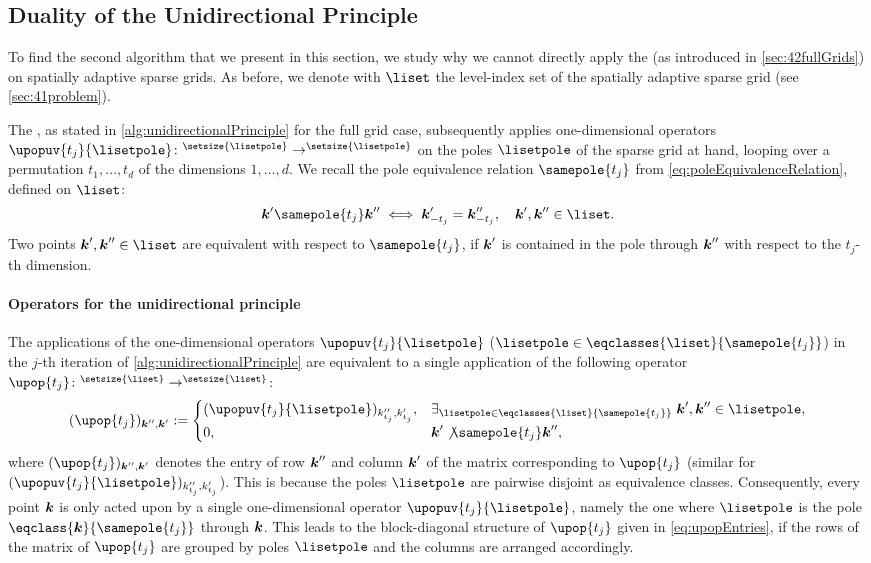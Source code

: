 \subsection{Duality of the Unidirectional Principle}
\label{sec:452duality}

To find the second algorithm that we present in this section,
we study why we cannot directly apply the \up
(as introduced in \cref{sec:42fullGrids}) on spatially adaptive sparse grids.
As before, we denote with $\liset$ the level-index set of
the spatially adaptive sparse grid (see \cref{sec:41problem}).

The \up, as stated in
\cref{alg:unidirectionalPrinciple} for the full grid case,
subsequently applies one-dimensional operators
$\upopuv{t_j}{\lisetpole}\colon \real^{\setsize{\lisetpole}} \to
\real^{\setsize{\lisetpole}}$
on the poles $\lisetpole$ of the sparse grid at hand,
looping over a permutation $t_1, \dotsc, t_d$
of the dimensions $1, \dotsc, d$.
We recall the pole equivalence relation $\samepole{t_j}$
from \cref{eq:poleEquivalenceRelation}, defined on $\liset$:
\begin{equation}
  \*k' \samepole{t_j} \*k'' \iff \*k'_{-t_j} = \*k''_{-t_j},\quad
  \*k', \*k'' \in \liset.
\end{equation}
Two points $\*k', \*k'' \in \liset$ are equivalent with respect to
$\samepole{t_j}$, if ${\boldsymbol{k}}'$ is contained in the pole through ${\boldsymbol{k}}''$
with respect to the $t_j$-th dimension.

\paragraph{Operators for the unidirectional principle}

The applications of the one-dimensional operators
$\upopuv{t_j}{\lisetpole}$
($\lisetpole \in \eqclasses{\liset}{\samepole{t_j}}$)
in the $j$-th iteration of \cref{alg:unidirectionalPrinciple}
are equivalent to a single application of the following operator
$\upop{t_j}\colon \real^{\setsize{\liset}} \to \real^{\setsize{\liset}}$:
\begin{equation}
  \label{eq:upopEntries}
  (\upop{t_j})_{\*k'',\*k'}
  :=
  \begin{cases}
    (\upopuv{t_j}{\lisetpole})_{k''_{t_j},k'_{t_j}},&
    \ex{\lisetpole \in \eqclasses{\liset}{\samepole{t_j}}}{
      \*k', \*k'' \in \lisetpole
    },\\
    0,&\*k' \not\samepole{t_j} \*k'',
  \end{cases}
\end{equation}
where $(\upop{t_j})_{\*k'',\*k'}$ denotes the entry of row ${\boldsymbol{k}}''$
and column ${\boldsymbol{k}}'$ of the matrix corresponding to $\upop{t_j}$
(similar for $(\upopuv{t_j}{\lisetpole})_{k''_{t_j},k'_{t_j}}$).
This is because the poles $\lisetpole$ are pairwise disjoint
as equivalence classes.
Consequently, every point ${\boldsymbol{k}}$ is only acted upon by a single
one-dimensional operator $\upopuv{t_j}{\lisetpole}$,
namely the one where $\lisetpole$ is the
pole $\eqclass{\*k}{\samepole{t_j}}$ through ${\boldsymbol{k}}$.
This leads to the block-diagonal structure
of $\upop{t_j}$ given in \eqref{eq:upopEntries},
if the rows of the matrix of $\upop{t_j}$
are grouped by poles $\lisetpole$ and the columns are arranged accordingly.

